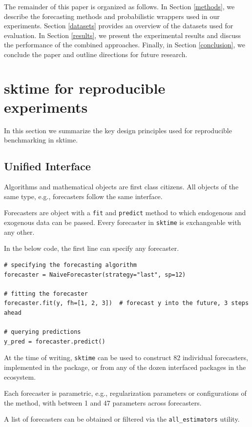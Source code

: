 The remainder of this paper is organized as follows. In Section \ref{methods}, we describe the forecasting methods and probabilistic wrappers used in our experiments. Section \ref{datasets} provides an overview of the datasets used for evaluation. In Section \ref{results}, we present the experimental results and discuss the performance of the combined approaches. Finally, in Section \ref{conclusion}, we conclude the paper and outline directions for future research.


\section{sktime for reproducible experiments}\label{sktime}

In this section we summarize the key design principles used for reproducible benchmarking in sktime.

\subsection{Unified Interface}

Algorithms and mathematical objects are first class citizens. All objects of the same type, e.g., forecasters follow the same interface.

Forecasters are object with a \texttt{fit} and \texttt{predict} method to which endogenous and exogenous data can be passed.
Every forecaster in \texttt{sktime} is exchangeable with any other.

In the below code, the first line can specify any forecaster.

\begin{verbatim}
# specifying the forecasting algorithm
forecaster = NaiveForecaster(strategy="last", sp=12)

# fitting the forecaster
forecaster.fit(y, fh=[1, 2, 3])  # forecast y into the future, 3 steps ahead

# querying predictions
y_pred = forecaster.predict()
\end{verbatim}

At the time of writing, \texttt{sktime} can be used to construct 82 individual forecasters,
implemented in the package, or from any of the dozen interfaced packages in the ecosystem.

Each forecaster is parametric, e.g., regularization parameters or configurations of the method,
with between 1 and 47 parameters across forecasters.

A list of forecasters can be obtained or filtered via the \texttt{all\_estimators} utility.

